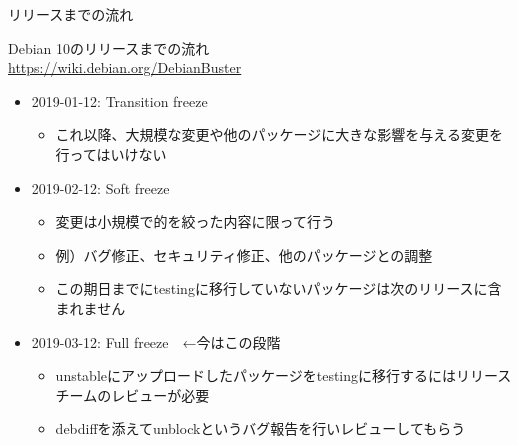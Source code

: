 \begin{frame}{リリースまでの流れ}%

Debian 10のリリースまでの流れ \\
\url{https://wiki.debian.org/DebianBuster}
  
\begin{itemize}
\item 2019-01-12: Transition freeze
  \begin{itemize}
  \item これ以降、大規模な変更や他のパッケージに大きな影響を与える変更を行ってはいけない
  \end{itemize}
\item 2019-02-12: Soft freeze
  \begin{itemize}
  \item 変更は小規模で的を絞った内容に限って行う
  \item 例）バグ修正、セキュリティ修正、他のパッケージとの調整
  \item この期日までにtestingに移行していないパッケージは次のリリースに含まれません
  \end{itemize}
\item 2019-03-12: Full freeze　←今はこの段階
  \begin{itemize}
  \item unstableにアップロードしたパッケージをtestingに移行するにはリリースチームのレビューが必要
  \item debdiffを添えてunblockというバグ報告を行いレビューしてもらう
  \end{itemize}
\end{itemize}
\end{frame}


